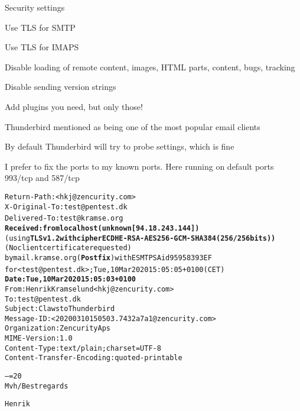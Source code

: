 \documentclass[Screen16to9,17pt]{foils}
\begin{document}


\begin{list2}
\item Security settings
\item Use TLS for SMTP
\item Use TLS for IMAPS
\item Disable loading of remote content, images, HTML parts, content, bugs, tracking
\item Disable sending version strings
\item Add plugins you need, but only those!
\end{list2}

Thunderbird mentioned as being one of the most popular email clients



By default Thunderbird will try to probe settings, which is fine



I prefer to fix the ports to my known ports. Here running on default ports 993/tcp and 587/tcp


\begin{alltt}\footnotesize
Return-Path: <hkj@zencurity.com>
X-Original-To: test@pentest.dk
Delivered-To: test@kramse.org{\bf
Received: from localhost (unknown [94.18.243.144])}
	(using {\bf TLSv1.2 with cipher ECDHE-RSA-AES256-GCM-SHA384 (256/256 bits))}
	(No client certificate requested)
	by mail.kramse.org ({\bf Postfix}) with ESMTPSA id 95958393EF
	for <test@pentest.dk>; Tue, 10 Mar 2020 15:05:05 +0100 (CET){\bf
Date: Tue, 10 Mar 2020 15:05:03 +0100}
From: Henrik Kramselund <hkj@zencurity.com>
To: test@pentest.dk
Subject: Claws to Thunderbird
Message-ID: <20200310150503.7432a7a1@zencurity.com>
Organization: Zencurity Aps
MIME-Version: 1.0
Content-Type: text/plain; charset=UTF-8
Content-Transfer-Encoding: quoted-printable

--=20
Mvh/Best regards

Henrik
\end{alltt}

\end{document}
